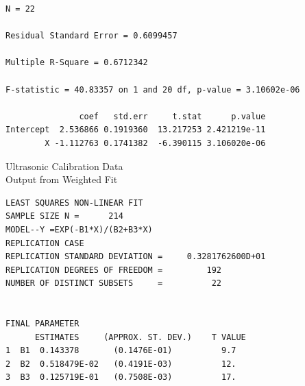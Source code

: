 {{{\begin{verbatim}
N = 22

Residual Standard Error = 0.6099457

Multiple R-Square = 0.6712342

F-statistic = 40.83357 on 1 and 20 df, p-value = 3.10602e-06

               coef   std.err     t.stat      p.value 
Intercept  2.536866 0.1919360  13.217253 2.421219e-11
        X -1.112763 0.1741382  -6.390115 3.106020e-06
\end{verbatim}
}
\clearpage
\begin{figure}
\end{figure}
\begin{figure}
\end{figure}
\begin{figure}
\end{figure}
\clearpage
\newpage
\begin{center}
Ultrasonic Calibration Data \\
Output from Weighted Fit
\end{center}
\vspace{0.5in}
{\large
\begin{verbatim}
LEAST SQUARES NON-LINEAR FIT
SAMPLE SIZE N =      214
MODEL--Y =EXP(-B1*X)/(B2+B3*X)
REPLICATION CASE
REPLICATION STANDARD DEVIATION =     0.3281762600D+01
REPLICATION DEGREES OF FREEDOM =         192
NUMBER OF DISTINCT SUBSETS     =          22
  
  
FINAL PARAMETER 
      ESTIMATES     (APPROX. ST. DEV.)    T VALUE
1  B1  0.143378       (0.1476E-01)          9.7
2  B2  0.518479E-02   (0.4191E-03)          12.
3  B3  0.125719E-01   (0.7508E-03)          17.
  

\end{verbatim}}}}
